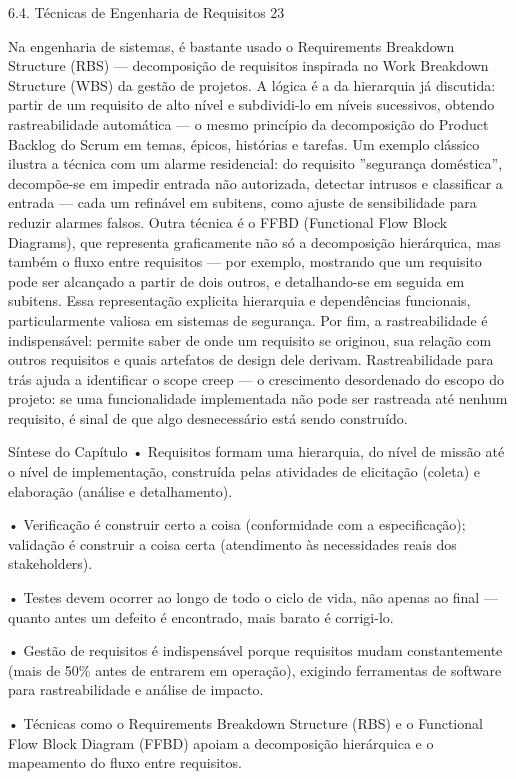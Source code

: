 6.4. Técnicas de Engenharia de Requisitos 23

Na engenharia de sistemas, é bastante usado o Requirements Breakdown Structure (RBS) — decomposição de requisitos inspirada no Work Breakdown Structure (WBS) da gestão de projetos. A lógica é a da hierarquia já discutida: partir de um requisito de alto nível e subdividi-lo em níveis sucessivos, obtendo rastreabilidade automática — o mesmo princípio da decomposição do Product Backlog do Scrum em temas, épicos, histórias e tarefas. Um exemplo clássico ilustra a técnica com um alarme residencial: do requisito ”segurança doméstica”, decompõe-se em impedir entrada não autorizada, detectar intrusos e classificar a entrada — cada um refinável em subitens, como ajuste de sensibilidade para reduzir alarmes falsos. Outra técnica é o FFBD (Functional Flow Block Diagrams), que representa graficamente não só a decomposição hierárquica, mas também o fluxo entre requisitos — por exemplo, mostrando que um requisito pode ser alcançado a partir de dois outros, e detalhando-se em seguida em subitens. Essa representação explicita hierarquia e dependências funcionais, particularmente valiosa em sistemas de segurança. Por fim, a rastreabilidade é indispensável: permite saber de onde um requisito se originou, sua relação com outros requisitos e quais artefatos de design dele derivam. Rastreabilidade para trás ajuda a identificar o scope creep — o crescimento desordenado do escopo do projeto: se uma funcionalidade implementada não pode ser rastreada até nenhum requisito, é sinal de que algo desnecessário está sendo construído.

Síntese do Capítulo • Requisitos formam uma hierarquia, do nível de missão até o nível de implementação, construída pelas atividades de elicitação (coleta) e elaboração (análise e detalhamento).

• Verificação é construir certo a coisa (conformidade com a especificação); validação é construir a coisa certa (atendimento às necessidades reais dos stakeholders).

• Testes devem ocorrer ao longo de todo o ciclo de vida, não apenas ao final — quanto antes um defeito é encontrado, mais barato é corrigi-lo.

• Gestão de requisitos é indispensável porque requisitos mudam constantemente (mais de 50\% antes de entrarem em operação), exigindo ferramentas de software para rastreabilidade e análise de impacto.

• Técnicas como o Requirements Breakdown Structure (RBS) e o Functional Flow Block Diagram (FFBD) apoiam a decomposição hierárquica e o mapeamento do fluxo entre requisitos.

